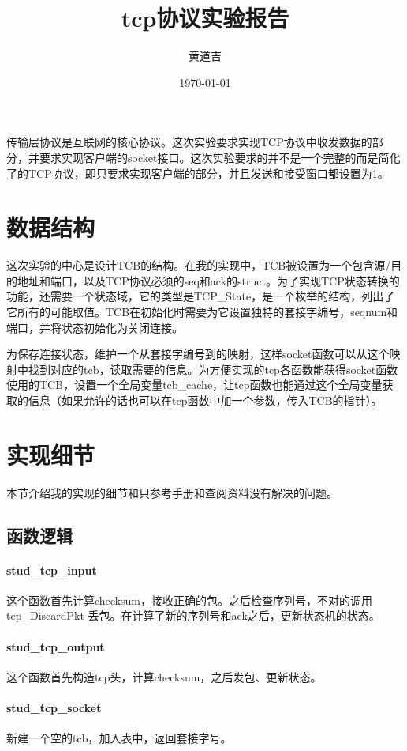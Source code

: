 \documentclass{article}
\author{黄道吉}
\title{tcp协议实验报告}
\date{\today}
\begin{document}
\maketitle

传输层协议是互联网的核心协议。这次实验要求实现TCP协议中收发数据的部分，并要求实现客户端的socket接口。这次实验要求的并不是一个完整的而是简化了的TCP协议，即只要求实现客户端的部分，并且发送和接受窗口都设置为1。

\section{数据结构}

这次实验的中心是设计TCB的结构。在我的实现中，TCB被设置为一个包含源/目的地址和端口，以及TCP协议必须的seq和ack的struct。为了实现TCP状态转换的功能，还需要一个状态域，它的类型是TCP\_State，是一个枚举的结构，列出了它所有的可能取值。TCB在初始化时需要为它设置独特的套接字编号，seqnum和端口，并将状态初始化为关闭连接。

为保存连接状态，维护一个从套接字编号到的映射，这样socket函数可以从这个映射中找到对应的tcb，读取需要的信息。为方便实现的tcp各函数能获得socket函数使用的TCB，设置一个全局变量tcb\_cache，让tcp函数也能通过这个全局变量获取的信息（如果允许的话也可以在tcp函数中加一个参数，传入TCB的指针）。

\section{实现细节}

本节介绍我的实现的细节和只参考手册和查阅资料没有解决的问题。

\subsection{函数逻辑}

\paragraph{stud\_tcp\_input} 这个函数首先计算checksum，接收正确的包。之后检查序列号，不对的调用 tcp\_DiscardPkt 丢包。在计算了新的序列号和ack之后，更新状态机的状态。

\paragraph{stud\_tcp\_output} 这个函数首先构造tcp头，计算checksum，之后发包、更新状态。

\paragraph{stud\_tcp\_socket} 新建一个空的tcb，加入表中，返回套接字号。
\end{document}
